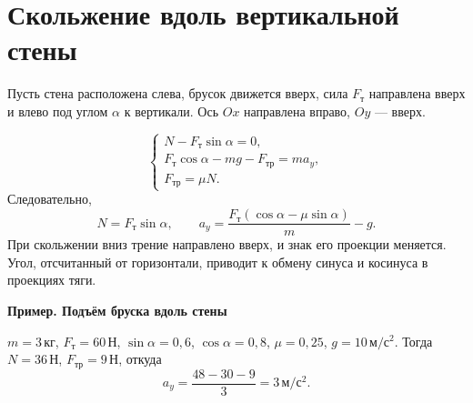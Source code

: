 \documentclass[a4paper,12pt]{article}
\newcommand{\fr}{F_{\text{тр}}}
\newcommand{\ft}{F_{\text{т}}}
\newcommand{\unit}[1]{\,\text{#1}}
\newcommand{\acc}{\unit{м/с$^2$}}
\newcommand{\N}{\unit{Н}}
\newcommand{\kg}{\unit{кг}}
\newcommand{\example}[1]{\par\medskip\textbf{\textcolor{darkaccent}{#1}}\par}
\begin{document}
\section{Скольжение вдоль вертикальной стены}
Пусть стена расположена слева, брусок движется вверх, сила $\ft$ направлена вверх и влево под углом $\alpha$ к вертикали. Ось $Ox$ направлена вправо, $Oy$ --- вверх.
\begin{center}
\end{center}
\[\begin{cases}N-\ft\sin\alpha=0,\\\ft\cos\alpha-mg-\fr=ma_y,\\\fr=\mu N.\end{cases}\]
Следовательно,
\[N=\ft\sin\alpha,\qquad a_y=\frac{\ft(\cos\alpha-\mu\sin\alpha)}{m}-g.\]
При скольжении вниз трение направлено вверх, и знак его проекции меняется. Угол, отсчитанный от горизонтали, приводит к обмену синуса и косинуса в проекциях тяги.
\example{Пример. Подъём бруска вдоль стены}
$m=3\kg$, $\ft=60\N$, $\sin\alpha=0,6$, $\cos\alpha=0,8$, $\mu=0,25$, $g=10\acc$. Тогда $N=36\N$, $\fr=9\N$, откуда
\[a_y=\frac{48-30-9}{3}=3\acc.\]
\clearpage
\end{document}
